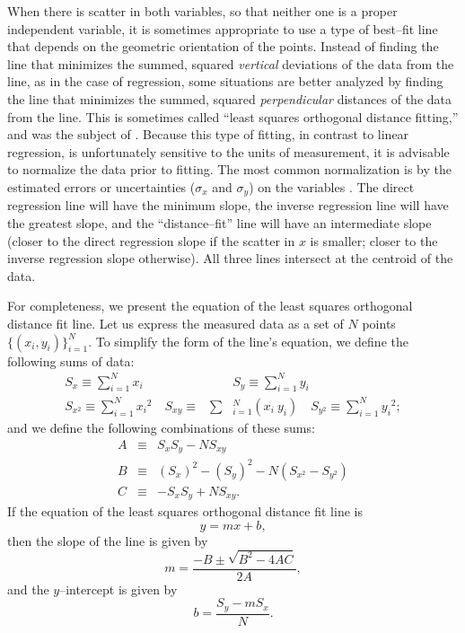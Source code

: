 \documentclass[12pt,preprint]{aastex}
\begin{document}
When there is scatter in both variables, so that neither one is a proper
independent variable, it is sometimes appropriate to use a type
of best--fit line that depends on the geometric orientation of the points.
Instead of finding the line that minimizes the summed, squared {\it vertical}
deviations of the data from the line, as in the case of regression,
some situations are better analyzed by finding the line that minimizes the
summed, squared {\it perpendicular} distances of the data from the line.  This
is sometimes called ``least squares orthogonal distance fitting,'' and was the
subject of \citet{pearson1901}.  Because this type of fitting,
in contrast to linear regression, is unfortunately sensitive to the units of
measurement, it is advisable to normalize the data prior to fitting.  The most
common normalization is by the estimated errors or uncertainties ($\sigma_x$
and $\sigma_y$) on the variables \citep{NR1992, akritas+bershady1996}.
The direct regression line will have the minimum slope, the inverse regression
line will have the greatest slope, and the ``distance--fit'' line will have an
intermediate slope (closer to the direct regression slope if the scatter in
$x$ is smaller; closer to the inverse regression slope otherwise).  All three
lines intersect at the centroid of the data.

For completeness, we present the equation of the least squares orthogonal
distance fit line.  Let us express the measured data as a set of $N$ points
$\{(x_i, y_i)\}_{i=1}^N$.
To simplify the form of the line's equation, we define the following sums
of data:
\begin{eqnarray}
\nonumber       S_x \equiv \sum_{i=1}^N x_i & & S_y \equiv \sum_{i=1}^N y_i \\
\label{eq:sums} S_{x^2} \equiv \sum_{i=1}^N {x_i}^2
 \quad S_{xy} \equiv & \sum&_{i=1}^N (x_i \: y_i)
 \quad S_{y^2} \equiv \sum_{i=1}^N {y_i}^2;
\end{eqnarray}
and we define the following combinations of these sums:
\begin{eqnarray}
\nonumber      A & \equiv & S_x S_y - NS_{xy}\\
\nonumber      B & \equiv & (S_x)^2 - (S_y)^2 - N(S_{x^2}-S_{y^2})\\
\label{eq:ABC} C & \equiv & - S_x S_y + NS_{xy}.
\end{eqnarray}
If the equation of the least squares orthogonal distance fit line is
\begin{equation}
y = m x + b,
\label{eq:basiclineeq}
\end{equation}
then the slope of the line is given by
\begin{equation}
m = \frac{-B \pm \sqrt{B^2 - 4AC}}{2A},
\label{eq:meq}
\end{equation}
and the $y$--intercept is given by
\begin{equation}
b = \frac{S_y - m S_x}{N}.
\label{eq:beq}
\end{equation}


%
\end{document}

